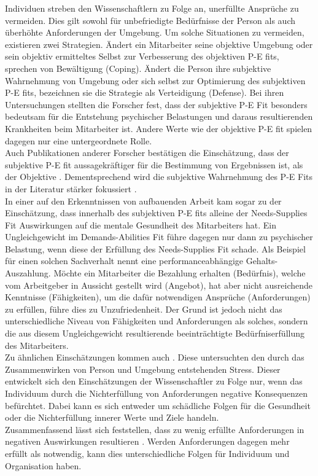 Individuen streben den Wissenschaftlern zu Folge an, unerfüllte Ansprüche zu vermeiden. Dies gilt sowohl für unbefriedigte Bedürfnisse der Person als auch überhöhte Anforderungen der Umgebung. Um solche Situationen zu vermeiden, existieren zwei Strategien. Ändert ein Mitarbeiter seine objektive Umgebung oder sein objektiv ermitteltes Selbst zur Verbesserung des objektiven P-E fits, sprechen \textcite{copingAndAdaption:1974} von Bewältigung (Coping). Ändert die Person ihre subjektive Wahrnehmung von Umgebung oder sich selbst zur Optimierung des subjektiven P-E fits, bezeichnen sie die Strategie als Verteidigung (Defense). Bei ihren Untersuchungen stellten die Forscher fest, dass der subjektive P-E Fit besonders bedeutsam für die Entstehung psychischer Belastungen und daraus resultierenden Krankheiten beim Mitarbeiter ist. Andere Werte wie der objektive P-E fit spielen dagegen nur eine untergeordnete Rolle. \\
Auch Publikationen anderer Forscher bestätigen die Einschätzung, dass der subjektive P-E fit aussagekräftiger für die Bestimmung von Ergebnissen ist, als der Objektive \cite[S. 3]{carless:2005}. Dementsprechend wird die subjektive Wahrnehmung des P-E Fits in der Literatur stärker fokussiert \cite[S. 8]{caplan:1987}\cite[S. 9]{caplan:1993}\cite[S. 16]{choi:2004}.\\
In einer auf den Erkenntnissen von \textcite{copingAndAdaption:1974} aufbauenden Arbeit kam \textcite{harrison:1978} sogar zu der Einschätzung, dass innerhalb des subjektiven P-E fits alleine der Needs-Supplies Fit Auswirkungen auf die mentale Gesundheit des Mitarbeiters hat. Ein Ungleichgewicht im Demands-Abilities Fit führe dagegen nur dann zu psychischer Belastung, wenn diese der Erfüllung des Needs-Supplies Fit schade. Als Beispiel für einen solchen Sachverhalt nennt \textcite{harrison:1978} eine performanceabhängige Gehalts-Auszahlung. Möchte ein Mitarbeiter die Bezahlung erhalten (Bedürfnis), welche vom Arbeitgeber in Aussicht gestellt wird (Angebot), hat aber nicht ausreichende Kenntnisse (Fähigkeiten), um die dafür notwendigen Ansprüche (Anforderungen) zu erfüllen, führe dies zu Unzufriedenheit. Der Grund ist jedoch nicht das unterschiedliche Niveau von Fähigkeiten und Anforderungen als solches, sondern die aus diesem Ungleichgewicht resultierende beeinträchtigte Bedürfniserfüllung des Mitarbeiters.\\
Zu ähnlichen Einschätzungen kommen auch \textcite[S. 1ff.]{lazarus:1978}. Diese untersuchten den durch das Zusammenwirken von Person und Umgebung entstehenden Stress. Dieser entwickelt sich den Einschätzungen der Wissenschaftler zu Folge nur, wenn das Individuum durch die Nichterfüllung von Anforderungen negative Konsequenzen befürchtet. Dabei kann es sich entweder um schädliche Folgen für die Gesundheit oder die Nichterfüllung innerer Werte und Ziele handeln.\\
Zusammenfassend lässt sich feststellen, dass zu wenig erfüllte Anforderungen in negativen Auswirkungen resultieren \cite[S. 5]{schuler:1980}. Werden Anforderungen dagegen mehr erfüllt als notwendig, kann dies unterschiedliche Folgen für Individuum und Organisation haben.

